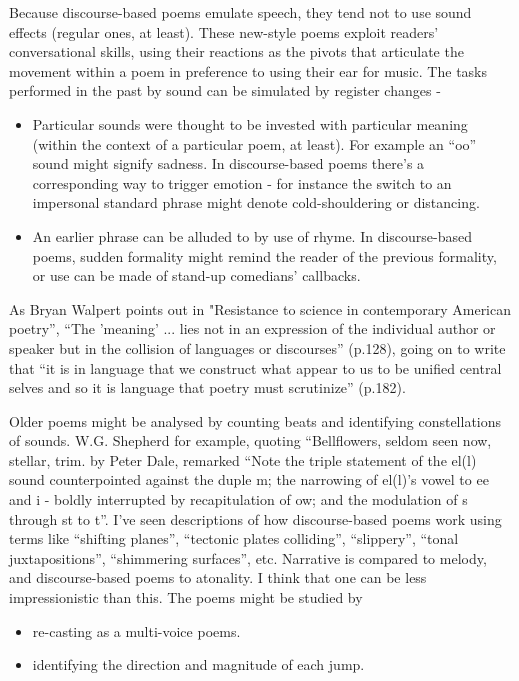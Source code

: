 \documentclass[11pt]{article}
\begin{document}
Because discourse-based poems emulate speech, they tend not to use sound effects (regular ones, at least). These new-style poems exploit readers' conversational skills, using their reactions as the pivots that articulate the movement within a poem in preference to using their ear for music. The tasks performed in the past by sound can be simulated by register changes -
\begin{itemize}
\item Particular sounds were thought to be invested with particular meaning (within the context of a particular poem, at least). For example an ``oo'' sound might signify sadness. In discourse-based poems there's a corresponding way to trigger emotion - for instance the switch to an impersonal standard phrase might denote cold-shouldering or distancing.
\item An earlier phrase can be alluded to by use of rhyme. In discourse-based poems, sudden formality might remind the reader of the previous formality, or use can be made of stand-up comedians' callbacks.

\end{itemize}


As Bryan Walpert points out in "Resistance to science in contemporary American poetry'', ``The 'meaning' ... lies not in an expression of the individual author or speaker but in the collision of languages or discourses'' (p.128), going on to write that ``it is in language that we construct what appear to us to be unified central selves and so it is language that poetry must scrutinize'' (p.182).

Older poems might be analysed by counting beats and identifying constellations of sounds. W.G. Shepherd for example, quoting ``Bellflowers, seldom seen now, stellar, trim. by Peter Dale, remarked ``Note the triple statement of the el(l) sound counterpointed against the duple m; the narrowing of el(l)'s vowel to ee and i - boldly interrupted by recapitulation of ow; and the modulation of s through st to t''. I've seen descriptions of how discourse-based poems work using terms like ``shifting planes'', ``tectonic plates colliding'', ``slippery'', ``tonal juxtapositions'', ``shimmering surfaces'', etc. Narrative is compared to melody, and discourse-based poems to atonality. I think that one can be less impressionistic than this. The poems might be studied by 
\begin{itemize}
\item re-casting as a multi-voice poems.
\item identifying the direction and magnitude of each jump.
\end{itemize}
\end{document}
